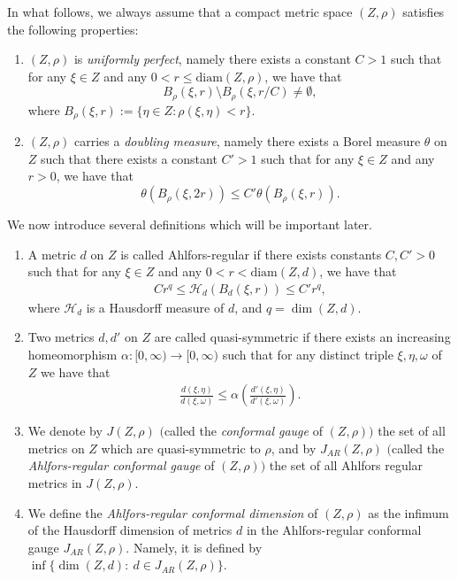 \documentclass[AHL,Unicode,longabstracts,published]{cedram}
\newcommand{\ch}{\mathcal{H}}
\newcommand{\diam}{\mathrm{diam}}
\newcommand*{\romanenumi}{\renewcommand*{\theenumi}{\roman{enumi}}}
\begin{document}
In what follows, we always assume that a compact metric space $(Z,\rho)$ satisfies the following properties:
\begin{enumerate}\romanenumi
\item $(Z,\rho)$ is \emph{uniformly perfect}, namely there exists a constant $C>1$ such that for any $\xi\in Z$ and any $0<r\leq\diam(Z,\rho)$, we have that
\[
B_{\rho}(\xi,r)\setminus B_{\rho}(\xi,r/C)\neq\emptyset,
\]
where $B_{\rho}(\xi,r):=\{\eta\in Z:\rho(\xi,\eta)<r\}$.
\item $(Z,\rho)$ carries a \emph{doubling measure}, namely there exists a Borel measure $\theta$ on $Z$ such that there exists a constant $C'>1$ such that for any $\xi\in Z$ and any $r>0$, we have that
\[
\theta(B_{\rho}(\xi,2r))\leq C'\theta(B_{\rho}(\xi,r)).
\]
\end{enumerate}
We now introduce several definitions which will be important later.
\begin{defi}\label{def:arcd}\leavevmode
\begin{enumerate}
\item\label{defi4.2.1} A metric $d$ on $Z$ is called Ahlfors-regular if there exists constants $C,C'>0$ such that for any $\xi\in Z$ and any $0<r<\diam(Z,d)$, we have that
\begin{align*}
Cr^q \leq\ch_{d}(B_{d}(\xi,r))\leq C'r^q,
\end{align*}
where $\ch_{d}$ is a Hausdorff measure of $d$, and $q=\dim(Z,d)$.
\item\label{defi4.2.2} Two metrics $d,d'$ on $Z$ are called quasi-symmetric if there exists an increasing homeomorphism $\alpha:[0,\infty)\to[0,\infty)$ such that for any distinct triple $\xi,\eta,\omega$ of $Z$ we have that
\begin{align*}
\frac{d(\xi,\eta)}{d(\xi,\omega)}\leq\alpha\left(\frac{d'(\xi,\eta)}{d'(\xi,\omega)}\right).
\end{align*}
\item\label{defi4.2.3} We denote by $J(Z,\rho)$ $($called the \emph{conformal gauge} of $(Z,\rho))$ the set of all metrics on $Z$ which are quasi-symmetric to $\rho$, and by $J_{AR}(Z,\rho)$ $($called the \emph{Ahlfors-regular conformal gauge} of $(Z,\rho))$ the set of all Ahlfors regular metrics in $J(Z,\rho)$.
\item\label{defi4.2.4} We define the \emph{Ahlfors-regular conformal dimension} of $(Z,\rho)$ as the infimum of the Hausdorff dimension of metrics $d$ in the Ahlfors-regular conformal gauge $J_{AR}(Z,\rho)$. Namely, it is defined by $\inf\{\dim(Z,d):\ d\in J_{AR}(Z,\rho)\}$.
\end{enumerate}
\end{defi}
\end{document}
